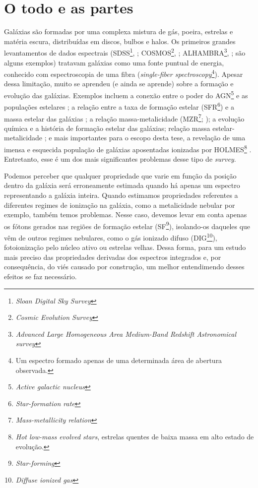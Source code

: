 \section{O todo e as partes}
\label{sec:intro:partes}

Galáxias são formadas por uma complexa mistura de gás, poeira, estrelas e matéria escura, distribuídas em discos, bulbos e halos. Os primeiros grandes levantamentos de dados espectrais (SDSS\footnote{\em Sloan Digital Sky Survey}, \citealt{York.etal.2000a}; COSMOS\footnote{\em Cosmic Evolution Survey}, \citealt{Scoville.etal.2007}; ALHAMBRA\footnote{\em Advanced Large Homogeneous Area Medium-Band Redshift Astronomical survey}, \citealt{Moles.etal.2008}; são alguns exemplos) tratavam galáxias como uma fonte puntual de energia, conhecido com espectroscopia de uma fibra ({\em single-fiber spectroscopy}\footnote{Um espectro formado apenas de uma determinada área de abertura observada.}). Apesar dessa limitação, muito se aprendeu (e ainda se aprende) sobre a formação e evolução das galáxias. Exemplos incluem a conexão entre o poder do AGN\footnote{\em Active galactic nucleus} e as populações estelares \citep{Kauffmann.etal.2003a}; a relação entre a taxa de formação estelar (SFR\footnote{\em Star-formation rate}) e a massa estelar das galáxias \citep{Brinchmann.etal.2004a}; a relação massa-metalicidade (MZR\footnote{\em Mass-metallicity relation}; \citealt{Tremonti.etal.2004a}); a evolução química e a história de formação estelar das galáxias\citep{CidFernandes.etal.2007, Asari.etal.2007a}; relação massa estelar-metalicidade \citep{ValeAsari.etal.2009a}; e mais importantes para o escopo desta tese, a revelação de uma imensa e esquecida população de galáxias aposentadas ionizadas por HOLMES\footnote{{\em Hot low-mass evolved stars}, estrelas quentes de baixa massa em alto estado de evolução.} \citep{Stasinska.etal.2008a, CidFernandes.etal.2010a, CidFernandes.etal.2011a}. Entretanto, esse é um dos mais significantes problemas desse tipo de {\em survey}.

Podemos perceber que qualquer propriedade que varie em função da posição dentro da galáxia será erroneamente estimada quando há apenas um espectro representando a galáxia inteira. Quando estimamos propriedades referentes a diferentes regimes de ionização na galáxia, como a metalicidade nebular por exemplo, também temos problemas. Nesse caso, devemos levar em conta apenas os fótons gerados nas regiões de formação estelar (SF\footnote{{\em Star-forming}}), isolando-os daqueles que vêm de outros regimes nebulares, como o gás ionizado difuso (DIG\footnote{{\em Diffuse ionized gas}}), fotoionização pelo núcleo ativo ou estrelas velhas. Dessa forma, para um estudo mais preciso das propriedades derivadas dos espectros integrados e, por consequência, do viés causado por construção, um melhor entendimendo desses efeitos se faz necessário.

